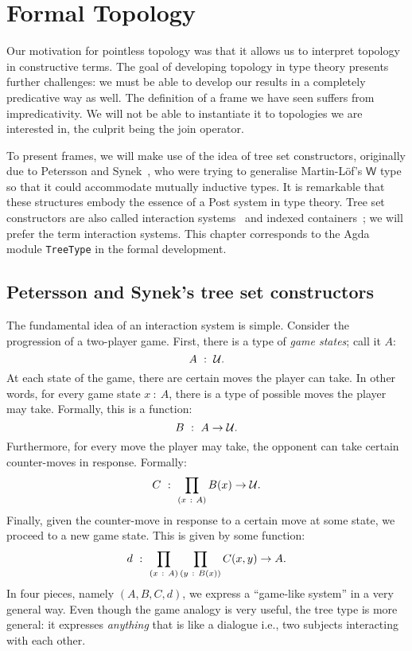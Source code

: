 \chapter{Formal Topology}\label{chap:formal-topo}

Our motivation for pointless topology was that it allows us to interpret topology in
constructive terms. The goal of developing topology in type theory presents further
challenges: we must be able to develop our results in a completely predicative way as
well. The definition of a frame we have seen suffers from impredicativity. We will not be
able to instantiate it to topologies we are interested in, the culprit being the join
operator.

To present frames, we will make use of the idea of tree set constructors, originally due
to Petersson and Synek~\cite{tree-sets}, who were trying to generalise Martin-Löf's
$\mathsf{W}$ type so that it could accommodate mutually inductive types. It is remarkable
that these structures embody the essence of a Post system in type theory. Tree set
constructors are also called interaction systems~\cite{hancock-interaction-systems} and
indexed containers~\cite{indexed-containers}; we will prefer the term interaction systems.
This chapter corresponds to the Agda module \texttt{TreeType} in the formal development.

\section{Petersson and Synek's tree set constructors}

The fundamental idea of an interaction system is simple. Consider the progression of a
two-player game. First, there is a type of \emph{game states}; call it $A$:
\begin{equation*}
  A~:~\mathcal{U}.
\end{equation*}
At each state of the game, there are certain moves the player can take. In other words,
for every game state $x~:~A$, there is a type of possible moves the player may take.
Formally, this is a function:
\begin{equation*}
  B~:~A \rightarrow \mathcal{U}.
\end{equation*}
Furthermore, for every move the player may take, the opponent can take certain
counter-moves in response. Formally:
\begin{equation*}
  C~:~\prod_{(x~:~A)} B(x) \rightarrow \mathcal{U}.
\end{equation*}
Finally, given the counter-move in response to a certain move at some state, we proceed to
a new game state. This is given by some function:
\begin{equation*}
  d~:~\prod_{(x~:~A)} \prod_{(y~:~B(x))} C(x, y) \rightarrow A.
\end{equation*}
In four pieces, namely $(A, B, C, d)$, we express a ``game-like system'' in a very general
way. Even though the game analogy is very useful, the tree type is more general: it
expresses \emph{anything} that is like a dialogue i.e., two subjects interacting with each
other.

